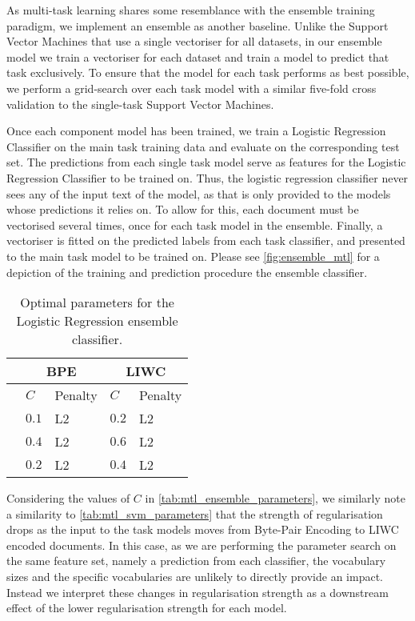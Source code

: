 As multi-task learning shares some resemblance with the ensemble training paradigm, we implement an ensemble as another baseline. Unlike the Support Vector Machines that use a single vectoriser for all datasets, in our ensemble model we train a vectoriser for each dataset and train a model to predict that task exclusively. To ensure that the model for each task performs as best possible, we perform a grid-search over each task model with a similar five-fold cross validation to the single-task Support Vector Machines.
\begin{figure}
  \centering
  \label{fig:ensemble_mtl}
\end{figure}

Once each component model has been trained, we train a Logistic Regression Classifier on the main task training data and evaluate on the corresponding test set. The predictions from each single task model serve as features for the Logistic Regression Classifier to be trained on. Thus, the logistic regression classifier never sees any of the input text of the model, as that is only provided to the models whose predictions it relies on. To allow for this, each document must be vectorised several times, once for each task model in the ensemble. Finally, a vectoriser is fitted on the predicted labels from each task classifier, and presented to the main task model to be trained on. Please see \autoref{fig:ensemble_mtl} for a depiction of the training and prediction procedure the ensemble classifier.

\begin{table}[]
\centering
\begin{tabular}{l|ll|ll}
                     & \multicolumn{2}{c}{BPE} & \multicolumn{2}{c}{LIWC} \\ \hline
                     & $C$     & Penalty       & $C$      & Penalty       \\ \hline
\cite{Waseem:2016}   & $0.1$   & L2            & $0.2$    & L2             \\
\cite{Davidson:2017} & $0.4$   & L2            & $0.6$    & L2             \\
\cite{Wulczyn:2017}  & $0.2$   & L2            & $0.4$    & L2
\end{tabular}
\caption{Optimal parameters for the Logistic Regression ensemble classifier.}
\label{tab:mtl_ensemble_parameters}
\end{table}

Considering the values of $C$ in \autoref{tab:mtl_ensemble_parameters}, we similarly note a similarity to \autoref{tab:mtl_svm_parameters} that the strength of regularisation drops as the input to the task models moves from Byte-Pair Encoding to LIWC encoded documents. In this case, as we are performing the parameter search on the same feature set, namely a prediction from each classifier, the vocabulary sizes and the specific vocabularies are unlikely to directly provide an impact. Instead we interpret these changes in regularisation strength as a downstream effect of the lower regularisation strength for each model.


